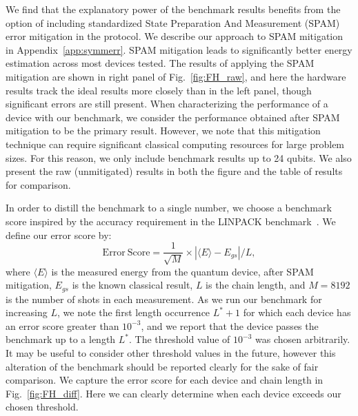 \documentclass[
prx,
superscriptaddress,
twocolumn,
longbibliography
]{revtex4-1}
\begin{document}
We find that the explanatory power of the benchmark results benefits from the option of including standardized State Preparation And Measurement (SPAM) error mitigation in the protocol. We describe our approach to SPAM mitigation in Appendix~\ref{app:symmerr}. SPAM mitigation leads to significantly better energy estimation across most devices tested. The results of applying the SPAM mitigation are shown in right panel of Fig.~\ref{fig:FH_raw}, and here the hardware results track the ideal results more closely than in the left panel, though significant errors are still present. When characterizing the performance of a device with our benchmark, we consider the performance obtained after SPAM mitigation to be the primary result. However, we note that this mitigation technique can require significant classical computing resources for large problem sizes. For this reason, we only include benchmark results up to 24 qubits. We also present the raw (unmitigated) results in both the figure and the table of results for comparison.

In order to distill the benchmark to a single number, we choose a benchmark score inspired by the accuracy requirement in the LINPACK benchmark~\cite{linpack}. We define our error score by:
\begin{equation}
    \mathrm{Error}~\mathrm{ Score} = \frac{1}{\sqrt{M}}\times|\langle E\rangle -E_{gs}|/L ,
\end{equation}
where $\langle E \rangle$ is the measured energy from the quantum device, after SPAM mitigation, $E_{gs}$ is the known classical result, $L$ is the chain length, and $M=8192$ is the number of shots in each measurement. As we run our benchmark for increasing $L$,  we note the first length occurrence $L^*+1$ for which each device has an error score greater than $10^{-3}$, and we report that the device passes the benchmark up to a length $L^*$. The threshold value of $10^{-3}$ was chosen arbitrarily. It may be useful to consider other threshold values in the future, however this alteration of the benchmark should be reported clearly for the sake of fair comparison. We capture the error score for each device and chain length in Fig.~\ref{fig:FH_diff}. Here we can clearly determine when each device exceeds our chosen threshold.
\end{document}

